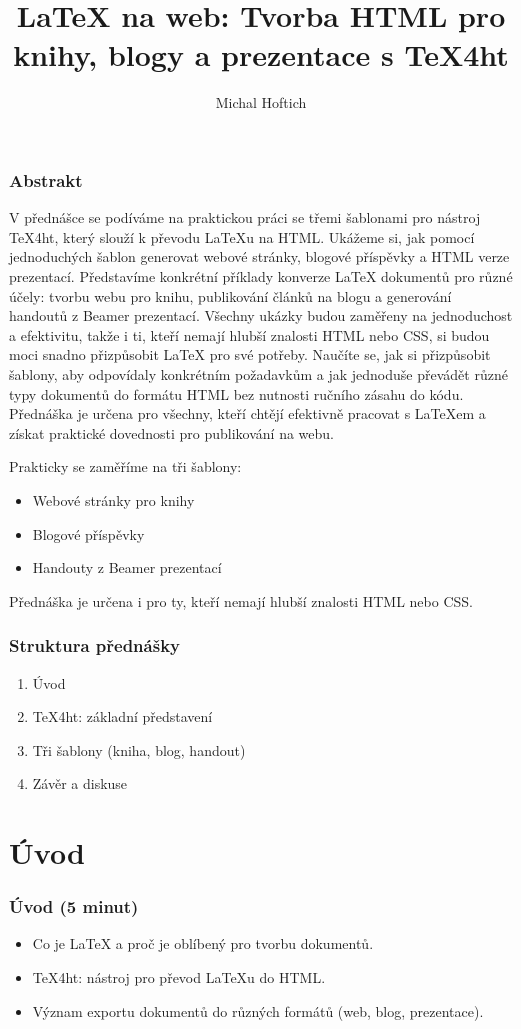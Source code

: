 \documentclass{beamer}
\title{LaTeX na web: Tvorba HTML pro knihy, blogy a prezentace s TeX4ht}
\author{Michal Hoftich}
\date{}
\begin{document}
\frame{\titlepage}

\begin{frame}
\frametitle{Abstrakt}
V přednášce se podíváme na praktickou práci se třemi šablonami pro nástroj TeX4ht, který slouží k převodu LaTeXu na HTML. Ukážeme si, jak pomocí jednoduchých šablon generovat webové stránky, blogové příspěvky a HTML verze prezentací. Představíme konkrétní příklady konverze LaTeX dokumentů pro různé účely: tvorbu webu pro knihu, publikování článků na blogu a generování handoutů z Beamer prezentací. Všechny ukázky budou zaměřeny na jednoduchost a efektivitu, takže i ti, kteří nemají hlubší znalosti HTML nebo CSS, si budou moci snadno přizpůsobit LaTeX pro své potřeby. Naučíte se, jak si přizpůsobit šablony, aby odpovídaly konkrétním požadavkům a jak jednoduše převádět různé typy dokumentů do formátu HTML bez nutnosti ručního zásahu do kódu. Přednáška je určena pro všechny, kteří chtějí efektivně pracovat s LaTeXem a získat praktické dovednosti pro publikování na webu.

Prakticky se zaměříme na tři šablony:
\begin{itemize}
    \item Webové stránky pro knihy
    \item Blogové příspěvky
    \item Handouty z Beamer prezentací
\end{itemize}
Přednáška je určena i pro ty, kteří nemají hlubší znalosti HTML nebo CSS.
\end{frame}

\begin{frame}
\frametitle{Struktura přednášky}
\begin{enumerate}
    \item Úvod
    \item TeX4ht: základní představení
    \item Tři šablony (kniha, blog, handout)
    \item Závěr a diskuse
\end{enumerate}
\end{frame}

\section{Úvod}
\begin{frame}
\frametitle{Úvod (5 minut)}
\begin{itemize}
    \item Co je LaTeX a proč je oblíbený pro tvorbu dokumentů.
    \item TeX4ht: nástroj pro převod LaTeXu do HTML.
    \item Význam exportu dokumentů do různých formátů (web, blog, prezentace).
\end{itemize}
\end{frame}
\end{document}
